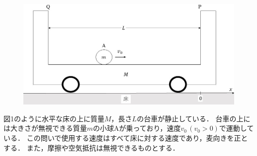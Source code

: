 {
\begin{figure}
  \vspace*{-\intextsep}
  \includegraphics[width=14zw]{../graphs/jumon_42.jpg}
\end{figure}

図1のように水平な床の上に質量$M$，長さ$L$の台車が静止している．
台車の上には大きさが無視できる質量$m$の小球Aが乗っており，速度$v_0\,(v_0>0)$で運動している．
この問いで使用する速度はすべて床に対する速度であり，麦向きを正とする．
また，摩擦や空気抵抗は無視できるものとする．
\par}

